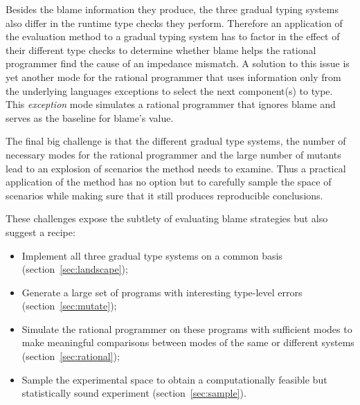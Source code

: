 
Besides the blame information they produce, the three gradual typing
systems also differ in the runtime type checks they perform. Therefore an
application of the evaluation method to a gradual typing system has to
factor in the effect of their different type checks to determine whether blame helps the
rational programmer find the cause of an impedance mismatch. A solution to this issue
is yet another mode for the rational programmer that uses information only
from the underlying languages exceptions to select the next component(s) to type.
This \emph{exception} mode simulates a rational programmer that ignores
blame and serves as the baseline for blame's value.


The final big challenge is that the different gradual type
systems, the number of necessary modes for the rational programmer
and the large number of mutants lead to an explosion of scenarios the
method needs to examine. Thus a practical application of the
method has no option but to carefully sample the space of scenarios while 
making sure that it still produces reproducible conclusions.


\smallskip

These challenges expose the subtlety of evaluating blame strategies but
also suggest a recipe:


\begin{itemize}

\item Implement all three gradual type systems on a common
  basis (section~\ref{sec:landscape});

\item Generate a large set of programs with interesting
  type-level errors (section~\ref{sec:mutate}); 
    
\item Simulate the rational programmer on these programs with sufficient 
  modes to make meaningful comparisons between modes of the same or
    different systems
    (section~\ref{sec:rational});



\item Sample the experimental space  to obtain a computationally feasible
  but statistically sound experiment (section~\ref{sec:sample}).

\end{itemize}
